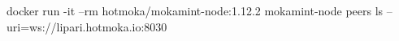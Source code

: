 \begin{shellcommandbox}\begin{ttlst}
docker run -it --rm hotmoka/mokamint-node:1.12.2 mokamint-node peers ls --uri=ws://lipari.hotmoka.io:8030
\end{ttlst}\end{shellcommandbox}
